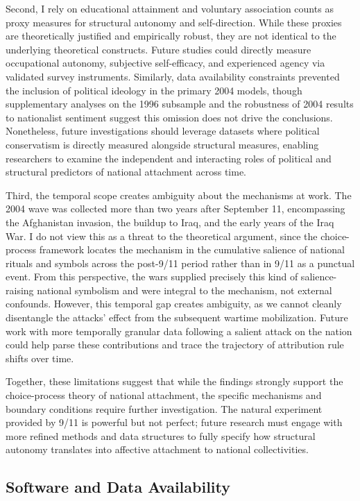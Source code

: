 \documentclass[12pt,letterpaper]{article}
\begin{document}
Second, I rely on educational attainment and voluntary association counts as proxy measures for structural autonomy and self-direction. While these proxies are theoretically justified and empirically robust, they are not identical to the underlying theoretical constructs. Future studies could directly measure occupational autonomy, subjective self-efficacy, and experienced agency via validated survey instruments. Similarly, data availability constraints prevented the inclusion of political ideology in the primary 2004 models, though supplementary analyses on the 1996 subsample and the robustness of 2004 results to nationalist sentiment suggest this omission does not drive the conclusions. Nonetheless, future investigations should leverage datasets where political conservatism is directly measured alongside structural measures, enabling researchers to examine the independent and interacting roles of political and structural predictors of national attachment across time.

Third, the temporal scope creates ambiguity about the mechanisms at work. The 2004 wave was collected more than two years after September 11, encompassing the Afghanistan invasion, the buildup to Iraq, and the early years of the Iraq War. I do not view this as a threat to the theoretical argument, since the choice-process framework locates the mechanism in the cumulative salience of national rituals and symbols across the post-9/11 period rather than in 9/11 as a punctual event. From this perspective, the wars supplied precisely this kind of salience-raising national symbolism and were integral to the mechanism, not external confounds. However, this temporal gap creates ambiguity, as we cannot cleanly disentangle the attacks' effect from the subsequent wartime mobilization. Future work with more temporally granular data following a salient attack on the nation could help parse these contributions and trace the trajectory of attribution rule shifts over time.

Together, these limitations suggest that while the findings strongly support the choice-process theory of national attachment, the specific mechanisms and boundary conditions require further investigation. The natural experiment provided by 9/11 is powerful but not perfect; future research must engage with more refined methods and data structures to fully specify how structural autonomy translates into affective attachment to national collectivities.

\subsection*{Software and Data Availability}
\end{document}
